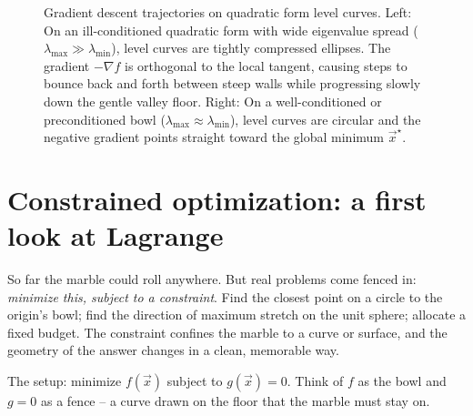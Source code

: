 \begin{figure}[H]
\caption{Gradient descent trajectories on quadratic form level curves. Left: On an ill-conditioned quadratic form with wide eigenvalue spread ($\lambda_{\max} \gg \lambda_{\min}$), level curves are tightly compressed ellipses. The gradient $-\nabla f$ is orthogonal to the local tangent, causing steps to bounce back and forth between steep walls while progressing slowly down the gentle valley floor. Right: On a well-conditioned or preconditioned bowl ($\lambda_{\max} \approx \lambda_{\min}$), level curves are circular and the negative gradient points straight toward the global minimum $\vec{x}^\star$.}
\label{ch36:fig-condition}
\end{figure}

\section{Constrained optimization: a first look at Lagrange}
\label{ch36:lagrange}

So far the marble could roll anywhere. But real problems come fenced in:
\emph{minimize this, subject to a constraint}. Find the closest point on a circle to
the origin's bowl; find the direction of maximum stretch on the unit sphere; allocate
a fixed budget. The constraint confines the marble to a curve or surface, and the
geometry of the answer changes in a clean, memorable way.

The setup: minimize $f(\vec{x})$ subject to $g(\vec{x})=0$. Think of $f$ as the bowl
and $g=0$ as a fence -- a curve drawn on the floor that the marble must stay on.


